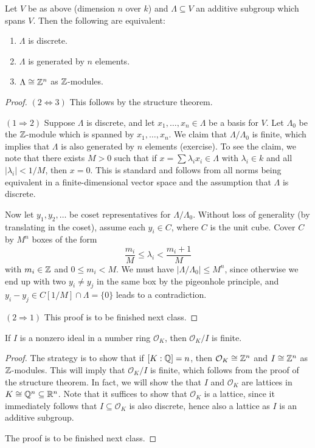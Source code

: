 \begin{prop}
  Let $V$ be as above (dimension $n$ over $k$) and
  $\Lambda \subseteq V$ an additive subgroup which
  spans $V$. Then the following are equivalent:
  \begin{enumerate}
    \item $\Lambda$ is discrete.
    \item $\Lambda$ is generated by $n$ elements.
    \item $\Lambda \cong \mathbb{Z}^n$ as $\mathbb{Z}$-modules.
  \end{enumerate}
\end{prop}

\begin{proof}
  $(2 \Leftrightarrow 3)$ This follows by the structure
  theorem.

  $(1 \Rightarrow 2)$ Suppose $\Lambda$ is discrete, and
  let $x_1, \dots, x_n \in \Lambda$ be a basis for $V$.
  Let $\Lambda_0$ be the $\mathbb{Z}$-module which is
  spanned by $x_1, \dots, x_n$. We claim that
  $\Lambda / \Lambda_0$ is finite, which implies that
  $\Lambda$ is also generated by $n$ elements (exercise).
  To see the claim, we note that there exists
  $M > 0$ such that if
  $x = \sum \lambda_i x_i \in \Lambda$ with
  $\lambda_i \in k$ and all $|\lambda_i| < 1 / M$,
  then $x = 0$. This is standard and follows from
  all norms being equivalent in a finite-dimensional
  vector space and the assumption that $\Lambda$ is
  discrete.

  Now let $y_1, y_2, \dots$ be coset representatives
  for $\Lambda / \Lambda_0$. Without loss of generality
  (by translating in the coset),
  assume each $y_i \in C$, where $C$ is the unit cube.
  Cover $C$ by $M^n$ boxes of the form
  \[
    \frac{m_i}{M} \le \lambda_i < \frac{m_i + 1}{M}
  \]
  with $m_i \in \mathbb{Z}$ and $0 \le m_i < M$. We must have
  $|\Lambda / \Lambda_0| \le M^n$, since otherwise
  we end up with two $y_i \ne y_j$ in the same box by the
  pigeonhole principle, and
  $y_i - y_j \in C[1 / M] \cap \Lambda = \{0\}$ leads
  to a contradiction.

  $(2 \Rightarrow 1)$ This proof is to be finished next
  class.
\end{proof}

\begin{theorem}
  If $I$ is a nonzero ideal in a number ring
  $\mathcal{O}_K$, then $\mathcal{O}_K / I$ is finite.
\end{theorem}

\begin{proof}
  The strategy is to show that if $[K : \mathbb{Q}] = n$, then
  $\mathcal{O}_K \cong \mathbb{Z}^n$ and $I \cong \mathbb{Z}^n$
  as $\mathbb{Z}$-modules. This will imply that
  $\mathcal{O}_K / I$ is finite, which follows from
  the proof of the structure theorem. In fact, we will
  show the that $I$ and $\mathcal{O}_K$
  are lattices in $K \cong \mathbb{Q}^n \subseteq \mathbb{R}^n$.
  Note
  that it suffices to show that $\mathcal{O}_K$ is
  a lattice, since it immediately follows that
  $I \subseteq \mathcal{O}_K$ is also discrete, hence
  also a lattice as $I$ is an additive subgroup.

  The proof is to be finished next class.
\end{proof}


